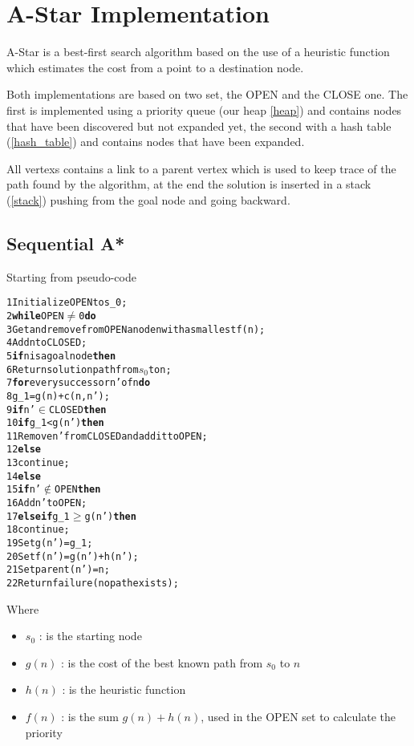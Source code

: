 \section{A-Star Implementation}
\label{Sec:implementation}

A-Star is a best-first search algorithm based on the use of a heuristic function which estimates the cost from a point to a destination node.

Both implementations are based on two set, the OPEN and the CLOSE one. The first is implemented using a priority queue (our heap \ref{heap}) and contains nodes that have been discovered but not expanded yet, the second with a hash table (\ref{hash_table}) and contains nodes that have been expanded.

All vertexs contains a link to a parent vertex which is used to keep trace of the path found by the algorithm, at the end the solution is inserted in a stack (\ref{stack}) pushing from the goal node and going backward.

\subsection{Sequential A*}

Starting from pseudo-code \cite{bibParAstar}

\begin{alltt}
    1 Initialize OPEN to s_0;
    2 {\bf while} OPEN \(\neq\) 0 {\bf do}
    3    Get and remove from OPEN a node n with a smallest f(n);
    4    Add n to CLOSED;
    5   {\bf if} n is a goal node {\bf then}
    6       Return solution path from \(s_0\) to n;
    7   {\bf for} every successor n' of n {\bf do}
    8       g_1 = g(n) + c(n, n');
    9      {\bf if} n' \(\in\) CLOSED {\bf then}
    10         {\bf if} g_1 < g(n') {\bf then}
    11             Remove n' from CLOSED and add it to OPEN;
    12         {\bf else}
    13             continue;
    14     {\bf else}
    15         {\bf if} n' \(\notin\) OPEN {\bf then}
    16             Add n' to OPEN;
    17         {\bf else if} g_1 \(\geq\) g(n') {\bf then}
    18             continue;
    19     Set g(n') = g_1;
    20     Set f(n') = g(n') + h(n');
    21     Set parent(n') = n;
    22 Return failure (no path exists);
\end{alltt}

Where
\begin{itemize}
    \item $s_0$ : is the starting node
    \item $g(n)$ : is the cost of the best known path from $s_0$ to $n$
    \item $h(n)$ : is the heuristic function
    \item $f(n)$ : is the sum $g(n) + h(n)$, used in the OPEN set to calculate the priority
\end{itemize}


